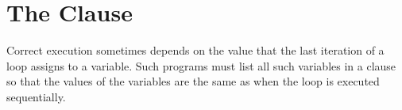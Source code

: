 \pagebreak
\chapter{The  Clause}
\label{chap:lastprivate}

Correct execution sometimes depends on the value that the last iteration of a loop 
assigns to a variable. Such programs must list all such variables in a  
clause  so that the values of the variables are the same as when the loop is executed 
sequentially.




